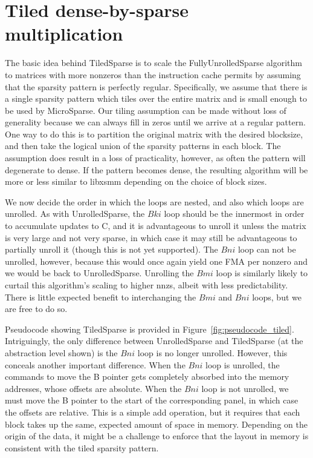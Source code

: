 \section{Tiled dense-by-sparse multiplication}

The basic idea behind TiledSparse is to scale the FullyUnrolledSparse algorithm to matrices with more nonzeros than the instruction cache permits by assuming that the sparsity pattern is perfectly regular. Specifically, we assume that there is a single sparsity pattern which tiles over the entire matrix and is small enough to be used by MicroSparse. Our tiling assumption can be made without loss of generality because we can always fill in zeros until we arrive at a regular pattern. One way to do this is to partition the original matrix with the desired blocksize, and then take the logical union of the sparsity patterns in each block. The assumption does result in a loss of practicality, however, as often the pattern will degenerate to dense. If the pattern becomes dense, the resulting algorithm will be more or less similar to libxsmm depending on the choice of block sizes.

We now decide the order in which the loops are nested, and also which loops are unrolled. As with UnrolledSparse, the $Bki$ loop should be the innermost in order to accumulate updates to C, and it is advantageous to unroll it unless the matrix is very large and not very sparse, in which case it may still be advantageous to partially unroll it (though this is not yet supported). The $Bni$ loop can not be unrolled, however, because this would once again yield one FMA per nonzero and we would be back to UnrolledSparse. Unrolling the $Bmi$ loop is similarly likely to curtail this algorithm's scaling to higher nnzs, albeit with less predictability. There is little expected benefit to interchanging the $Bmi$ and $Bni$ loops, but we are free to do so.

Pseudocode showing TiledSparse is provided in Figure~\ref{fig:pseudocode_tiled}. Intriguingly, the only difference between UnrolledSparse and TiledSparse (at the abstraction level shown) is the $Bni$ loop is no longer unrolled. However, this conceals another important difference. When the $Bni$ loop is unrolled, the commands to move the B pointer gets completely absorbed into the memory addresses, whose offsets are absolute. When the $Bni$ loop is not unrolled, we must move the B pointer to the start of the corresponding panel, in which case the offsets are relative. This is a simple add operation, but it requires that each block takes up the same, expected amount of space in memory. Depending on the origin of the data, it might be a challenge to enforce that the layout in memory is consistent with the tiled sparsity pattern.

